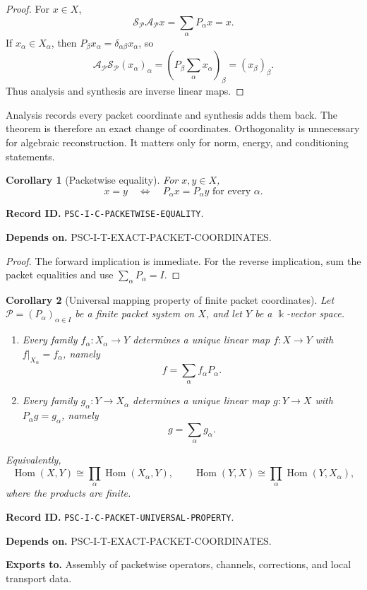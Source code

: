 \documentclass[11pt]{article}
\newtheorem{corollary}[corollary]{Corollary}
\theoremstyle{definition}
\theoremstyle{remark}
\newcommand{\bbk}{\Bbbk}
\newcommand{\Pcal}{\mathcal P}
\newcommand{\Hom}{\operatorname{Hom}}
\newcommand{\RecordID}[1]{\par\smallskip\noindent\begingroup\footnotesize\color{PSCGray}\raggedright\textbf{Record ID.} \nolinkurl{#1}.\par\endgroup}
\newcommand{\Depends}[1]{\par\noindent\begingroup\footnotesize\color{PSCGray}\raggedright\textbf{Depends on.} #1\par\endgroup}
\newcommand{\Exports}[1]{\par\noindent\begingroup\footnotesize\color{PSCGray}\raggedright\textbf{Exports to.} #1\par\endgroup}
\begin{document}
\begin{proof}
For $x\in X$,
\[
\mathcal S_{\Pcal}\mathcal A_{\Pcal}x
=
\sum_\alpha P_\alpha x
=x.
\]
If $x_\alpha\in X_\alpha$, then $P_\beta x_\alpha=\delta_{\alpha\beta}x_\alpha$, so
\[
\mathcal A_{\Pcal}\mathcal S_{\Pcal}(x_\alpha)_\alpha
=
\left(P_\beta\sum_\alpha x_\alpha\right)_\beta
=(x_\beta)_\beta.
\]
Thus analysis and synthesis are inverse linear maps.
\end{proof}

\begin{keyidea}
Analysis records every packet coordinate and synthesis adds them back.  The theorem is therefore an exact change of coordinates.  Orthogonality is unnecessary for algebraic reconstruction.  It matters only for norm, energy, and conditioning statements.
\end{keyidea}


\begin{corollary}[Packetwise equality]
\label{cor:packetwise-equality}
For $x,y\in X$,
\[
x=y
\quad\Longleftrightarrow\quad
P_\alpha x=P_\alpha y\text{ for every }\alpha.
\]
\end{corollary}
\RecordID{PSC-I-C-PACKETWISE-EQUALITY}
\Depends{PSC-I-T-EXACT-PACKET-COORDINATES.}

\begin{proof}
The forward implication is immediate.  For the reverse implication, sum the packet equalities and use $\sum_\alpha P_\alpha=I$.
\end{proof}



\begin{corollary}[Universal mapping property of finite packet coordinates]
\label{cor:packet-universal-property}
Let \(\Pcal=(P_\alpha)_{\alpha\in I}\) be a finite packet system on \(X\), and let \(Y\) be a \(\bbk\)-vector space.
\begin{enumerate}
\item Every family \(f_\alpha:X_\alpha\to Y\) determines a unique linear map \(f:X\to Y\) with \(f|_{X_\alpha}=f_\alpha\), namely
\[
f=\sum_\alpha f_\alpha P_\alpha.
\]
\item Every family \(g_\alpha:Y\to X_\alpha\) determines a unique linear map \(g:Y\to X\) with \(P_\alpha g=g_\alpha\), namely
\[
g=\sum_\alpha g_\alpha.
\]
\end{enumerate}
Equivalently,
\[
\Hom(X,Y)\cong\prod_\alpha\Hom(X_\alpha,Y),
\qquad
\Hom(Y,X)\cong\prod_\alpha\Hom(Y,X_\alpha),
\]
where the products are finite.
\end{corollary}
\RecordID{PSC-I-C-PACKET-UNIVERSAL-PROPERTY}
\Depends{PSC-I-T-EXACT-PACKET-COORDINATES.}
\Exports{Assembly of packetwise operators, channels, corrections, and local transport data.}
\end{document}
